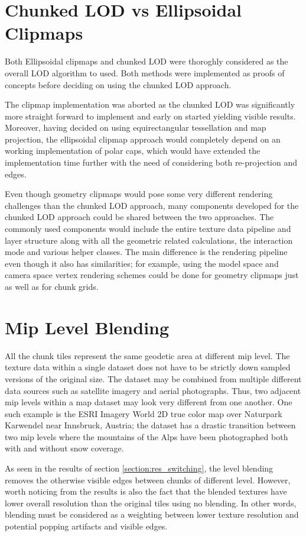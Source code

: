 \section{Chunked LOD vs Ellipsoidal Clipmaps}
Both Ellipsoidal clipmaps and chunked LOD were thoroghly considered as the overall LOD algorithm to used. Both methods were implemented as proofs of concepts before deciding on using the chunked LOD approach.

The clipmap implementation was aborted as the chunked LOD was significantly more straight forward to implement and early on started yielding visible results. Moreover, having decided on using equirectangular tessellation and map projection, the ellipsoidal clipmap approach would completely depend on an working implementation of polar caps, which would have extended the implementation time further with the need of considering both re-projection and edges.

Even though geometry clipmaps would pose some very different rendering challenges than the chunked LOD approach, many components developed for the chunked LOD approach could be shared between the two approaches.
The commonly used components would include the entire texture data pipeline and layer structure along with all the geometric related calculations, the interaction mode and various helper classes. The main difference is the rendering pipeline even though it also has similarities; for example, using the model space and camera space vertex rendering schemes could be done for geometry clipmaps just as well as for chunk grids.

\section{Mip Level Blending}
All the chunk tiles represent the same geodetic area at different mip level. 
The texture data within a single dataset does not have to be strictly down sampled versions of the original size. 
The dataset may be combined from multiple different data sources such as satellite imagery and aerial photographs. 
Thus, two adjacent mip levels within a map dataset may look very different from one another. 
One such example is the ESRI Imagery World 2D true color map over Naturpark Karwendel near Innsbruck, Austria; the dataset has a drastic transition between two mip levels where the mountains of the Alps have been photographed both with and without snow coverage.

As seen in the results of section \ref{section:res_switching}, the level blending removes the otherwise visible edges between chunks of different level. However, worth noticing from the results is also the fact that the blended textures have lower overall resolution than the original tiles using no blending. In other words, blending must be considered as a weighting between lower texture resolution and potential popping artifacts and visible edges. 

